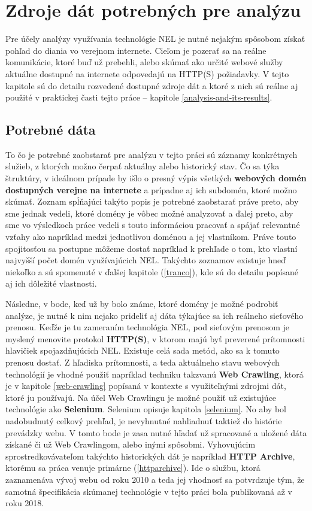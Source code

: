 \chapter{Zdroje dát potrebných pre analýzu}
\label{data-sources-available-for-research}

Pre účely analýzy využívania technológie NEL je nutné nejakým spôsobom získať pohľad do diania vo verejnom internete.
Cieľom je pozerať sa na reálne komunikácie, ktoré buď už prebehli, alebo skúmať ako určité webové služby aktuálne dostupné na internete
odpovedajú na HTTP(S) požiadavky. V tejto kapitole sú do detailu rozvedené dostupné zdroje dát 
a ktoré z nich sú reálne aj použité v praktickej časti tejto práce -- kapitole \ref{analysis-and-its-results}.

\section{Potrebné dáta}

To čo je potrebné zaobstarať pre analýzu v tejto práci sú záznamy konkrétnych služieb, z ktorých možno čerpať aktuálny alebo historický stav. Čo sa týka štruktúry, v ideálnom prípade by išlo o presný výpis všetkých \textbf{webových domén dostupných verejne na internete} a prípadne aj ich subdomén, ktoré možno skúmať. 
Zoznam spĺňajúci takýto popis je potrebné zaobstarať práve preto, aby sme jednak vedeli, ktoré domény je vôbec možné analyzovať a ďalej preto, aby sme vo výsledkoch práce vedeli s touto informáciou pracovať a spájať relevantné vzťahy ako napríklad medzi jednotlivou doménou a jej vlastníkom. 
Práve touto spojitosťou sa postupne môžeme dostať napríklad k prehľade o tom, kto vlastní najvyšší počet domén využívajúcich NEL. 
Takýchto zoznamov existuje hneď niekoľko a sú spomenuté v ďalšej kapitole (\ref{tranco}), kde sú do detailu popísané aj ich dôležité vlastnosti.

Následne, v bode, keď už by bolo známe, ktoré domény je možné podrobiť analýze, je nutné k nim nejako prideliť aj dáta týkajúce sa ich reálneho sieťového prenosu. 
Keďže je tu zameraním technológia NEL, pod sieťovým prenosom je myslený menovite protokol \textbf{HTTP(S)}, v ktorom majú byť preverené prítomnosti hlavičiek spojazdňujúcich NEL. Existuje celá sada metód, ako sa k tomuto prenosu dostať. 
Z hľadiska prítomnosti, a teda aktuálneho stavu webových technológií je vhodné použiť napríklad techniku takzvanú \textbf{Web Crawling}, ktorá je v kapitole \ref{web-crawling} popísaná v kontexte s využiteľnými zdrojmi dát, ktoré ju používajú.
Na účel Web Crawlingu je možné použiť už existujúce technológie ako \textbf{Selenium}. 
Selenium opisuje kapitola \ref{selenium}.
No aby bol nadobudnutý celkový prehľad, je nevyhnutné nahliadnuť taktiež do histórie prevádzky webu. 
V tomto bode je zasa nutné hľadať už spracované a uložené dáta získané či už Web Crawlingom, alebo inými spôsobmi. 
Vyhovujúcim sprostredkovávateľom takýchto historických dát je napríklad \textbf{HTTP Archive}, ktorému sa práca venuje primárne (\ref{httparchive}).
Ide o službu, ktorá zaznamenáva vývoj webu od roku 2010 a teda jej vhodnosť sa potvrdzuje tým, že samotná špecifikácia skúmanej technológie v tejto práci bola publikovaná až v roku 2018.

